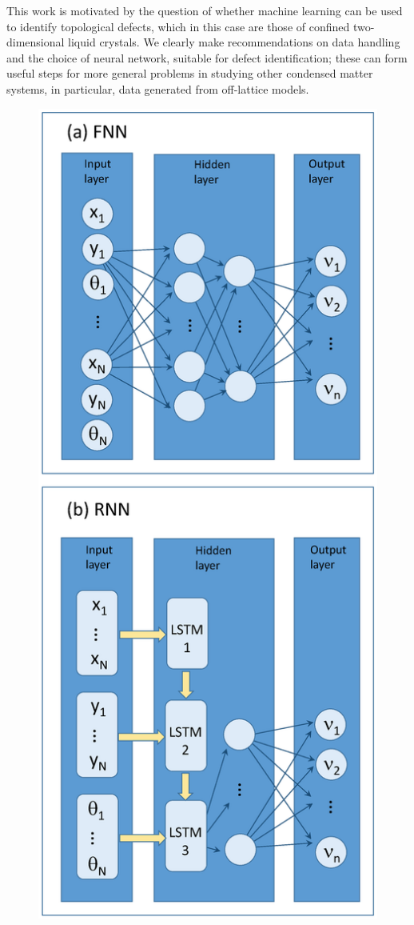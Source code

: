 This work is motivated by the question of whether machine learning can be used to identify topological defects, which in this case are those of confined two-dimensional liquid crystals. We clearly make recommendations on data handling and
the choice of neural network, suitable for defect identification; these can form useful steps for  more general problems in studying other condensed matter systems, in particular, data generated from off-lattice models.

\begin{figure}
	\includegraphics[width=0.8\columnwidth]{./figs/FIG2.eps}

\end{figure}
